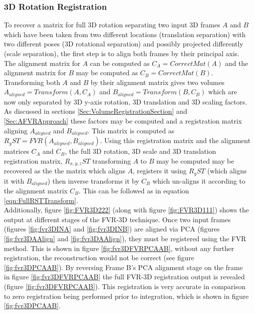 \subsubsection{3D Rotation Registration}

To recover a matrix for full 3D rotation separating two input 3D frames $A$ and $B$ which have been taken from two different locations (translation separation) with two different poses (3D rotational separation) and possibly projected differently (scale separation), the first step is to align both frames by their principal axis. The alignment matrix for $A$ can be computed as $C_A = CorrectMat(A)$ and the alignment matrix for $B$ may be computed as $C_B = CorrectMat(B)$. Transforming both $A$ and $B$ by their alignment matrix gives two volumes $A_{aligned} = Transform(A, C_A)$ and $B_{aligned} = Transform(B, C_B)$ which are now only separated by 3D y-axis rotation, 3D translation and 3D scaling factors. As discussed in sections \ref{Sec:VolumeRegistrationSection} and \ref{Sec:AFVRApproach} these factors may be computed and a registration matrix aligning $A_{aligned}$ and $B_{aligned}$. This matrix is computed as $R_{y}ST = FVR(A_{aligned},B_{aligned})$. Using this registration matrix and the alignment matrices $C_{A}$ and $C_{B}$, the full 3D rotation, 3D scale and 3D translation registration matrix, $R_{x,y,z}ST$ transforming $A$ to $B$ may be computed may be recovered as the the matrix which aligns $A$, registers it using $R_{y}ST$ (which aligns it with $B_{aligned}$) then inverse transforms it by $C_{B}$ which un-aligns it according to the alignment matrix $C_B$. This can be followed as in equation \ref{eqn:FullRSTTransform}. \\


Additionally, figure \ref{fig:FVR3D222} (along with figure \ref{fig:FVR3D111}) shows the output at different stages of the FVR-3D technique. Once two input frames (figures \ref{fig:fvr3DINA} and \ref{fig:fvr3DINB}) are aligned via PCA (figures \ref{fig:fvr3DAAlign} and \ref{fig:fvr3DAAlign}), they must be registered using the FVR method. This is shown in figure \ref{fig:fvr3DFVRPCAAB}, without any further registration, the reconstruction would not be correct (see figure \ref{fig:fvr3DPCAAB}). By reversing Frame B's PCA alignment stage on the frame in figure \ref{fig:fvr3DFVRPCAAB} the full FVR-3D registration output is revealed (figure \ref{fig:fvr3DFVRPCAAB}). This registration is very accurate in comparison to zero registration being performed prior to integration, which is shown in figure \ref{fig:fvr3DPCAAB}. \\
 


